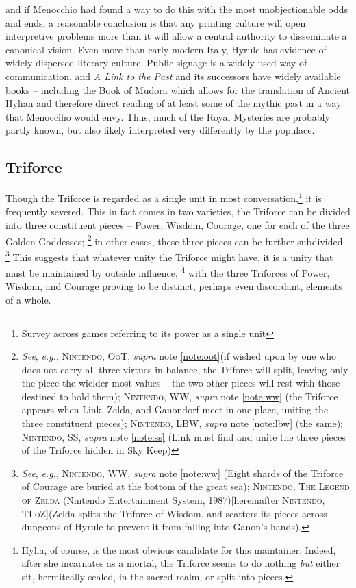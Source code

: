 \documentclass[../FGP.tex]{subfiles}
\begin{document}
and if Menocchio had found a way to do this with the most unobjectionable odds and ends, a reasonable conclusion is that any printing culture will open interpretive problems more than it will allow a central authority to disseminate a canonical vision. Even more than early modern Italy, Hyrule has evidence of widely dispersed literary culture. Public signage is a widely-used way of communication, and \emph{A Link to the Past} and its successors have widely available books -- including the Book of Mudora which allows for the translation of Ancient Hylian and therefore direct reading of at least some of the mythic past in a way that Menocciho would envy. Thus, much of the Royal Mysteries are probably partly known, but also likely interpreted very differently by the populace. 

\subsection{Triforce}Though the Triforce is regarded as a single unit in most conversation,\footnote{Survey across games referring to its power as a single unit} it is frequently severed. This in fact comes in two varieties, the Triforce can be divided into three constituent pieces -- Power, Wisdom, Courage, one for each of the three Golden Goddesses;%
  \footnote{\textit{See}, \textit{e.g.}, \textsc{Nintendo, OoT}, \textit{supra} note \ref{note:oot}(if wished upon by one who does not carry all three virtues in balance, the Triforce will split, leaving only the piece the wielder most values -- the two other pieces will rest with those destined to hold them); \textsc{Nintendo, WW}, \textit{supra} note \ref{note:ww} (the Triforce appears when Link, Zelda, and Ganondorf meet in one place, uniting the three constituent pieces); \textsc{Nintendo, LBW}, \textit{supra} note \ref{note:lbw} (the same); \textsc{Nintendo, SS}, \textit{supra} note \ref{note:ss} (Link must find and unite the three pieces of the Triforce hidden in Sky Keep)}
in other cases, these three pieces can be further subdivided.%
  \footnote{\textit{See}, \textit{e.g.}, \textsc{Nintendo, WW}, \textit{supra} note \ref{note:ww} (Eight shards of the Triforce of Courage are buried at the bottom of the great sea); \textsc{Nintendo, The Legend of Zelda} (Nintendo Entertainment System, 1987)[hereinafter \textsc{Nintendo, TLoZ}](Zelda splits the Triforce of Wisdom, and scatters its pieces across dungeons of Hyrule to prevent it from falling into Ganon's hands).}
This suggests that whatever unity the Triforce might have, it is a unity that must be maintained by outside influence,%
  \footnote{Hylia, of course, is the most obvious candidate for this maintainer. Indeed, after she incarnates as a mortal, the Triforce seems to do nothing \emph{but} either sit, hermitcally sealed, in the sacred realm, or split into pieces.}
with the three Triforces of Power, Wisdom, and Courage proving to be distinct, perhaps even discordant, elements of a whole. 
\end{document}

